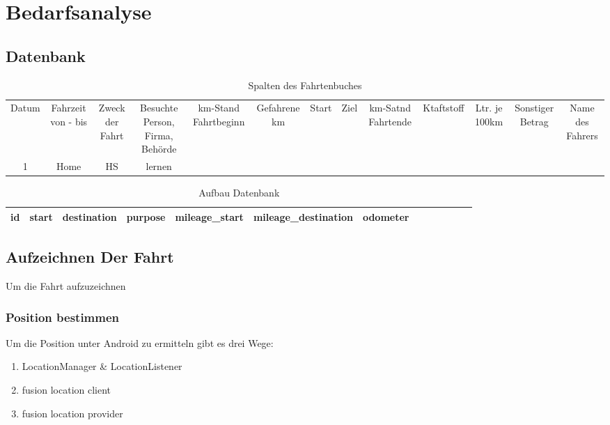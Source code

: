 \documentclass[a4paper]{article}
\begin{document}


\section{Bedarfsanalyse}

\subsection{Datenbank}

 \begin{table}
	\caption{Spalten des Fahrtenbuches}
    \centering
	\begin{tabular}{c c c c c c c c c c c c c}
		\hline
		Datum & Fahrzeit von - bis & Zweck der Fahrt  & Besuchte Person, Firma, Behörde &
		km-Stand Fahrtbeginn & Gefahrene km & Start & Ziel & km-Satnd Fahrtende & Ktaftstoff &
		Ltr. je 100km & Sonstiger Betrag & Name des Fahrers\\ [0.5ex]
		1 & Home & HS & lernen \\ [1ex]
		\hline
	\end{tabular}
	\label{table:nonlin}
 \end{table}

 \begin{table}
	\caption{Aufbau Datenbank}
    \centering
	\begin{tabular}{c c c c c c c c c c c c c}
		\hline
        id & start & destination & purpose & mileage_start & mileage_destination & odometer \\ [1ex]
		\hline
	\end{tabular}
	\label{table:nonlin}
 \end{table}

\subsection{Aufzeichnen Der Fahrt}
Um die Fahrt aufzuzeichnen

\subsubsection{Position bestimmen}
Um die Position unter Android zu ermitteln gibt es drei Wege:
\begin{enumerate}
	\item  LocationManager & LocationListener
	\item fusion location client
	\item fusion location provider
\end{enumerate}
\end{document}
